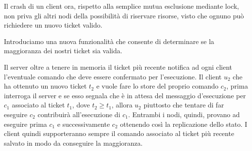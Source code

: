 	Il crash di un client ora, rispetto alla semplice mutua esclusione mediante lock, non priva gli altri nodi della possibilità di riservare risorse, visto che ognuno può richiedere un nuovo ticket valido.
	
	
	Introduciamo una nuova funzionalità che consente di determinare se la maggioranza dei nostri ticket sia valida.
	
	Il server oltre a tenere in memoria il ticket più recente notifica ad ogni client l'eventuale comando che deve essere confermato per l'esecuzione. Il client $u_2$ che ha ottenuto un nuovo ticket $t_2$ e vuole fare lo store del proprio comando $c_2$, prima interroga il server e se esso segnala che è in attesa del messaggio d'esecuzione per $c_1$ associato al ticket $t_1$, dove $t_2 \geq t_1$, allora $u_2$ piuttosto che tentare di far eseguire $c_2$ contribuirà all'esecuzione di $c_1$. Entrambi i nodi, quindi, provano ad eseguire prima $c_1$ e successivamente $c_2$ ottenendo così la replicazione dello stato. I client quindi supporteranno sempre il comando associato al ticket più recente salvato in modo da conseguire la maggioranza. 
	


